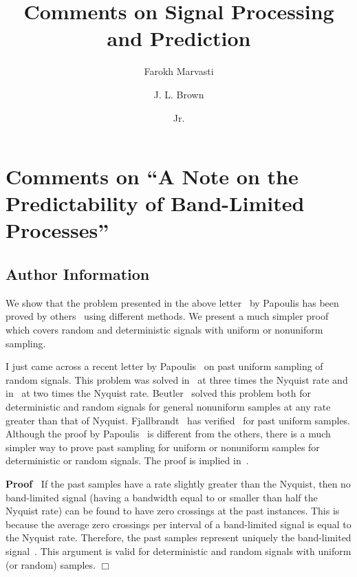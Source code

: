 \documentclass{article}
\newcommand{\tmtextbf}[1]{\text{{\bfseries{#1}}}}
\newenvironment{proof}{\noindent\textbf{Proof\ }}{\hspace*{\fill}$\Box$\medskip}
\begin{document}
\title{Comments on Signal Processing and Prediction}

\author{
  Farokh Marvasti
  \and
  J. L. Brown
  \and
  Jr.
}

\date{}

\maketitle

\section{Comments on ``A Note on the Predictability of Band-Limited
Processes''}\label{sec:comments}

\subsection*{Author Information}

\tmtextbf{FAROKH MARVASTI}

We show that the problem presented in the above letter~{\cite{papoulis1985}}
by Papoulis has been proved by
others~{\cite{beutler1966,fjallbrandt1975,requicha1980,knab1981}} using
different methods. We present a much simpler proof which covers random and
deterministic signals with uniform or nonuniform sampling.

I just came across a recent letter by Papoulis~{\cite{papoulis1985}} on past
uniform sampling of random signals. This problem was solved
in~{\cite{wainstein1962}} at three times the Nyquist rate and
in~{\cite{brown1972}} at two times the Nyquist rate.
Beutler~{\cite{beutler1966}} solved this problem both for deterministic and
random signals for general nonuniform samples at any rate greater than that of
Nyquist. Fjallbrandt~{\cite{fjallbrandt1975}} has
verified~{\cite{beutler1966}} for past uniform samples. Although the proof by
Papoulis~{\cite{papoulis1985}} is different from the others, there is a much
simpler way to prove past sampling for uniform or nonuniform samples for
deterministic or random signals. The proof is implied
in~{\cite{requicha1980}}.

\begin{proof}
  \label{proof:main}If the past samples have a rate slightly greater than the
  Nyquist, then no band-limited signal (having a bandwidth equal to or smaller
  than half the Nyquist rate) can be found to have zero crossings at the past
  instances. This is because the average zero crossings per interval of a
  band-limited signal is equal to the Nyquist rate. Therefore, the past
  samples represent uniquely the band-limited signal~{\cite{requicha1980}}.
  This argument is valid for deterministic and random signals with uniform (or
  random) samples.
\end{proof}
\end{document}
